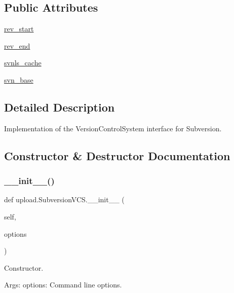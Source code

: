 \subsection*{Public Attributes}
\begin{DoxyCompactItemize}
\item 
\mbox{\hyperlink{classupload_1_1SubversionVCS_ad1553a69f4a790309273dbdeb9077732}{rev\+\_\+start}}
\item 
\mbox{\hyperlink{classupload_1_1SubversionVCS_ac0bb07a099c722b7f8622de4b225904f}{rev\+\_\+end}}
\item 
\mbox{\hyperlink{classupload_1_1SubversionVCS_aa801782f807674b06f491df5d7ca9942}{svnls\+\_\+cache}}
\item 
\mbox{\hyperlink{classupload_1_1SubversionVCS_a60645c40d2fea4cd52881576bd13341f}{svn\+\_\+base}}
\end{DoxyCompactItemize}


\subsection{Detailed Description}
\begin{DoxyVerb}Implementation of the VersionControlSystem interface for Subversion.\end{DoxyVerb}
 

\subsection{Constructor \& Destructor Documentation}
\mbox{\label{classupload_1_1SubversionVCS_a8333f94e27335ce83eed0cc3f5a1eeb0}} 
\subsubsection{\texorpdfstring{\_\_init\_\_()}{\_\_init\_\_()}\hspace{0.1cm}{\footnotesize\ttfamily [1/2]}}
{\footnotesize\ttfamily def upload.\+Subversion\+V\+C\+S.\+\_\+\+\_\+init\+\_\+\+\_\+ (\begin{DoxyParamCaption}\item[{}]{self,  }\item[{}]{options }\end{DoxyParamCaption})}

\begin{DoxyVerb}Constructor.

Args:
  options: Command line options.
\end{DoxyVerb}
 

